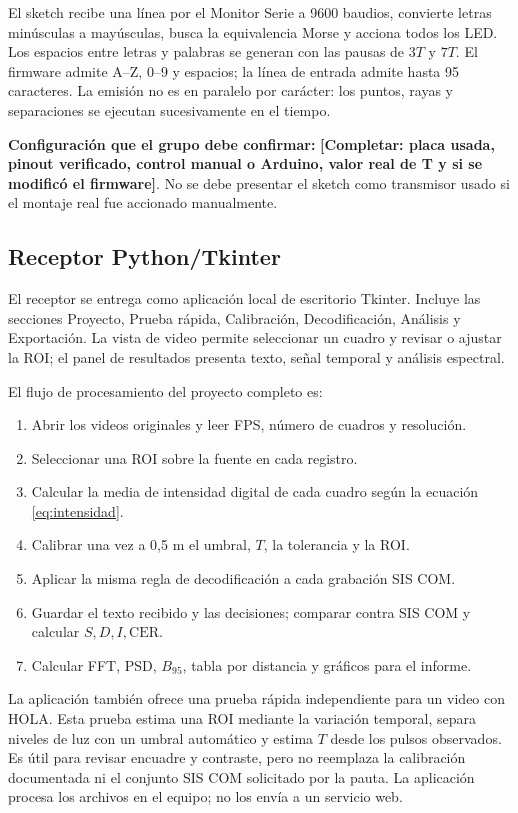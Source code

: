 \documentclass[11pt,a4paper]{article}
\newcommand{\Completar}[1]{\textcolor{Pending}{\textbf{[Completar: #1]}}}
\begin{document}
El sketch recibe una línea por el Monitor Serie a 9600 baudios, convierte letras minúsculas a mayúsculas, busca la equivalencia Morse y acciona todos los LED. Los espacios entre letras y palabras se generan con las pausas de \(3T\) y \(7T\). El firmware admite A--Z, 0--9 y espacios; la línea de entrada admite hasta 95 caracteres. La emisión no es en paralelo por carácter: los puntos, rayas y separaciones se ejecutan sucesivamente en el tiempo.

\textbf{Configuración que el grupo debe confirmar:} \Completar{placa usada, pinout verificado, control manual o Arduino, valor real de T y si se modificó el firmware}. No se debe presentar el sketch como transmisor usado si el montaje real fue accionado manualmente.

\subsection{Receptor Python/Tkinter}
El receptor se entrega como aplicación local de escritorio Tkinter. Incluye las secciones Proyecto, Prueba rápida, Calibración, Decodificación, Análisis y Exportación. La vista de video permite seleccionar un cuadro y revisar o ajustar la ROI; el panel de resultados presenta texto, señal temporal y análisis espectral.

El flujo de procesamiento del proyecto completo es:
\begin{enumerate}
    \item Abrir los videos originales y leer FPS, número de cuadros y resolución.
    \item Seleccionar una ROI sobre la fuente en cada registro.
    \item Calcular la media de intensidad digital de cada cuadro según la ecuación \eqref{eq:intensidad}.
    \item Calibrar una vez a 0,5 m el umbral, \(T\), la tolerancia y la ROI.
    \item Aplicar la misma regla de decodificación a cada grabación SIS COM.
    \item Guardar el texto recibido y las decisiones; comparar contra SIS COM y calcular \(S,D,I,\mathrm{CER}\).
    \item Calcular FFT, PSD, \(B_{95}\), tabla por distancia y gráficos para el informe.
\end{enumerate}

La aplicación también ofrece una prueba rápida independiente para un video con HOLA. Esta prueba estima una ROI mediante la variación temporal, separa niveles de luz con un umbral automático y estima \(T\) desde los pulsos observados. Es útil para revisar encuadre y contraste, pero no reemplaza la calibración documentada ni el conjunto SIS COM solicitado por la pauta. La aplicación procesa los archivos en el equipo; no los envía a un servicio web.
\end{document}
